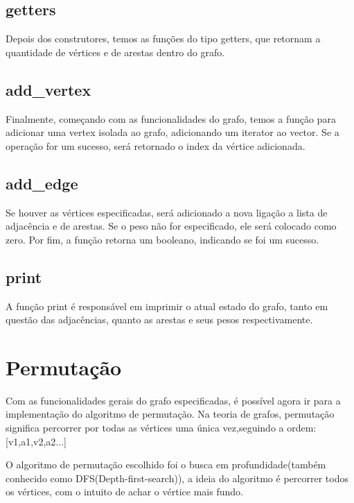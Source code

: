 \documentclass[12pt]{article}
\begin{document}
  \subsection{getters}

    Depois dos construtores, temos as funções do tipo getters, que retornam a quantidade de vértices 
    e de arestas dentro do grafo.

  \subsection{add\_vertex}

    Finalmente, começando com as funcionalidades do grafo, temos a função para adicionar 
    uma vertex isolada ao grafo, adicionando um iterator ao vector. Se a operação for um sucesso, 
    será retornado o index da vértice adicionada.

  \subsection{add\_edge}

    Se houver as vértices especificadas, será adicionado a nova ligação a lista de 
    adjacência e de arestas. Se o peso não for especificado, ele será colocado como zero.
    Por fim, a função retorna um booleano, indicando se foi um sucesso.

  \subsection{print}

    A função print é responsável em imprimir o atual estado do grafo, tanto
    em questão das adjacências, quanto as arestas e seus pesos respectivamente.

  \section{Permutação} \label{sec:permutation}

    Com as funcionalidades gerais do grafo especificadas, é possível agora ir para a 
    implementação do algoritmo de permutação. Na teoria de grafos, permutação significa
    percorrer por todas as vértices uma única vez,seguindo a ordem: [v1,a1,v2,a2...]

    O algoritmo de permutação escolhido foi o busca em profundidade(também conhecido 
    como DFS(Depth-first-search)), a ideia do algoritmo é percorrer todos os vértices,
    com o intuito de achar o vértice mais fundo.
    
\end{document}
